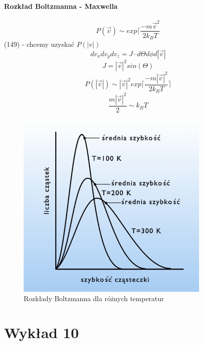 \documentclass{article}
\begin{document}
		\paragraph{Rozkład Boltzmanna - Maxwella}
		\begin{equation}
		P(\vec{v}) \sim exp\lceil \frac{-m\vec{v}^2}{2k_BT}
		\end{equation}
		(149) - chcemy uzyskać $ P(|v|) $
		\begin{equation}
		dv_xdv_ydv_z = J\cdot d\Theta d\phi d|\vec{v}|
		\end{equation}
		\begin{equation}
		J = |\vec{v}|^2sin(\Theta)
		\end{equation}
		\begin{equation}
		P(|\vec{v}|) \sim |\vec{v}|^2exp\lceil \frac{-m|\vec{v}|^2}{2k_BT} \rceil
		\end{equation}
		\begin{equation}
		\frac{m|\vec{v}|^2}{2} \sim k_BT
		\end{equation}
		\begin{figure}[ht]
			\label{fig:fig1}
			\centering
			\includegraphics[scale=0.5]{boltzmann.jpg}
			\caption{Rozkłady Boltzmanna dla różnych temperatur}
		\end{figure}
	\section{Wykład 10}
\end{document}
